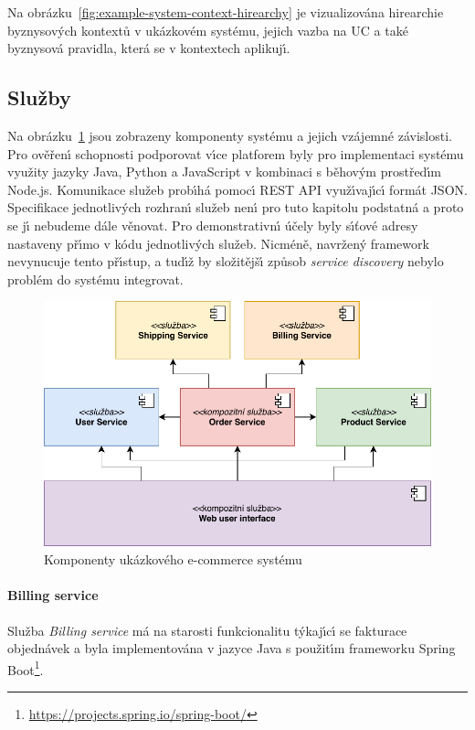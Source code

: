 Na obrázku~\ref{fig:example-system-context-hirearchy} je vizualizována
hirearchie byznysov\'ych kontextů v ukázkovém systému, jejich vazba na \gls{UC}
a také byznysová pravidla, která se v kontextech aplikuj\'{\i}.

\subsection{Služby}

Na obrázku~\ref{fig:example-system} jsou zobrazeny komponenty systému a jejich vzájemné závislosti.
Pro ověřen\'{\i} schopnosti podporovat v\'{\i}ce platforem byly pro implementaci systému využity
jazyky Java, Python a JavaScript v kombinaci s běhov\'ym prostřed\'{\i}m Node.js.
Komunikace služeb prob\'{\i}há pomoc\'{\i} \gls{REST} \gls{API} využ\'{\i}vaj\'{\i}c\'{\i} formát \gls{JSON}.
Specifikace jednotliv\'ych rozhran\'{\i} služeb nen\'{\i} pro tuto kapitolu podstatná a proto se
j\'{\i} nebudeme dále věnovat. Pro demonstrativn\'{\i} účely byly s\'{\i}ťové adresy nastaveny př\'{\i}mo v kódu jednotliv\'ych
služeb. Nicméně, navržen\'y framework nevynucuje tento př\'{\i}stup, a tud\'{\i}ž by složitějš\'{\i}
způsob \textit{service discovery} nebylo problém do systému integrovat.

\begin{figure}
    \centering
    \includegraphics[keepaspectratio=true, width=0.8\linewidth]{figures/example-system.pdf}
    \caption{Komponenty ukázkového e-commerce systému}
    \label{fig:example-system}
\end{figure}

\paragraph{Billing service}

Služba \textit{Billing service} má na starosti funkcionalitu t\'ykaj\'{\i}c\'{\i} se fakturace objednávek
a byla implementována v jazyce Java s použit\'{\i}m frameworku Spring Boot\footnote{\url{https://projects.spring.io/spring-boot/}}.

